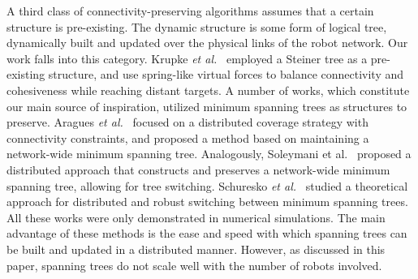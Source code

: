 A third class of connectivity-preserving algorithms assumes that a
certain structure is pre-existing. The dynamic structure is some form
of logical tree, dynamically built and updated over the physical links
of the robot network. Our work falls into this category. Krupke
\emph{et al.}~\cite{Krupke2015} employed a Steiner tree as a
pre-existing structure, and use spring-like virtual forces to balance
connectivity and cohesiveness while reaching distant targets. A number
of works, which constitute our main source of inspiration, utilized
minimum spanning trees as structures to preserve.  Aragues \emph{et
  al.}~\cite{Aragues2014} focused on a distributed coverage strategy
with connectivity constraints, and proposed a method based on
maintaining a network-wide minimum spanning tree. Analogously,
Soleymani et al.~\cite{Soleymani2015} proposed a distributed approach
that constructs and preserves a network-wide minimum spanning tree,
allowing for tree switching. Schuresko \emph{et
  al.}~\cite{Schuresko2012} studied a theoretical approach for
distributed and robust switching between minimum spanning trees.  All
these works were only demonstrated in numerical simulations. The main
advantage of these methods is the ease and speed with which spanning
trees can be built and updated in a distributed manner. However, as
discussed in this paper, spanning trees do not scale well with the
number of robots involved.


